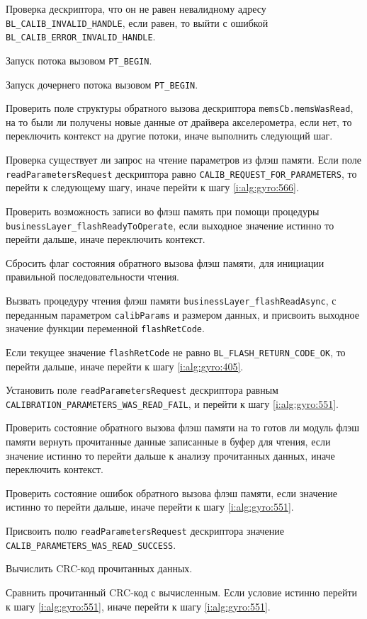 \begin{enumerate_step}
    \item Проверка дескриптора, что он не равен невалидному адресу \lstinline|BL_CALIB_INVALID_HANDLE|, если равен, то выйти с ошибкой
    \lstinline|BL_CALIB_ERROR_INVALID_HANDLE|.
    \item Запуск потока вызовом \lstinline|PT_BEGIN|.
    \item Запуск дочернего потока вызовом \lstinline|PT_BEGIN|.
    \item \label{i:alg:gyro:551} Проверить поле структуры обратного вызова дескриптора \lstinline|memsCb.memsWasRead|, на то были ли получены новые данные от драйвера акселерометра, 
    если нет, то переключить контекст на другие потоки, иначе выполнить следующий шаг.
    \item \label{i:alg:gyro:557} Проверка существует ли запрос на чтение параметров из флэш памяти. Если поле \lstinline|readParametersRequest| дескриптора равно \lstinline|CALIB_REQUEST_FOR_PARAMETERS|,
    то перейти к следующему шагу, иначе перейти к шагу \ref{i:alg:gyro:566}.
    \item Проверить возможность записи во флэш память при помощи процедуры \lstinline|businessLayer_flashReadyToOperate|, если выходное значение истинно то перейти дальше, иначе переключить контекст.
    \item Сбросить флаг состояния обратного вызова флэш памяти, для инициации правильной последовательности чтения.
    \item Вызвать процедуру чтения флэш памяти \lstinline|businessLayer_flashReadAsync|, с переданным параметром \lstinline|calibParams| и размером данных, и присвоить выходное значение функции переменной \lstinline|flashRetCode|.
    \item Если текущее значение \lstinline|flashRetCode| не равно \lstinline|BL_FLASH_RETURN_CODE_OK|, то перейти дальше, иначе перейти к шагу
    \ref{i:alg:gyro:405}.
    \item Установить поле \lstinline|readParametersRequest| дескриптора равным \lstinline|CALIBRATION_PARAMETERS_WAS_READ_FAIL|, и перейти к шагу \ref{i:alg:gyro:551}.
    \item \label{i:alg:gyro:405}  Проверить состояние обратного вызова флэш памяти на то готов ли модуль флэш памяти вернуть
    прочитанные данные записанные в буфер для чтения, если значение
    истинно то перейти дальше к анализу прочитанных данных, иначе
    переключить контекст.
    \item Проверить состояние ошибок обратного вызова флэш памяти, если значение истинно то перейти дальше, иначе перейти к шагу \ref{i:alg:gyro:551}.
    \item Присвоить полю \lstinline|readParametersRequest| дескриптора значение \lstinline|CALIB_PARAMETERS_WAS_READ_SUCCESS|.
    \item Вычислить CRC-код прочитанных данных.
    \item Сравнить прочитанный CRC-код с вычисленным. Если условие истинно перейти к шагу \ref{i:alg:gyro:551}, иначе перейти к шагу \ref{i:alg:gyro:551}.
    

\end{enumerate_step}
